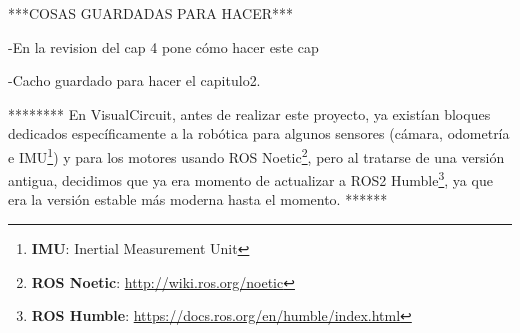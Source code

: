 ***COSAS GUARDADAS PARA HACER***

-En la revision del cap 4 pone cómo hacer este cap

-Cacho guardado para hacer el capitulo2.

********
En VisualCircuit, antes de realizar este proyecto, ya existían bloques dedicados específicamente a la robótica para algunos sensores
(cámara, odometría e IMU\footnote{\textbf{IMU}: Inertial Measurement Unit}) y para los motores usando ROS
Noetic\footnote{\textbf{ROS Noetic}: \url{http://wiki.ros.org/noetic}}, pero al tratarse de una versión antigua, decidimos que ya era
momento de actualizar a ROS2 Humble\footnote{\textbf{ROS Humble}: \url{https://docs.ros.org/en/humble/index.html}}, ya que era la versión estable
más moderna hasta el momento.
******












